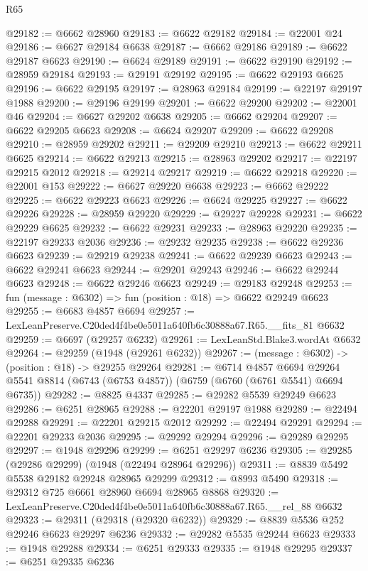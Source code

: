 \begin{lexlean}{R65}
\begin{coremodule}
{@29182 := @6662 @28960
@29183 := @6622 @29182
@29184 := @22001 @24
@29186 := @6627 @29184 @6638
@29187 := @6662 @29186
@29189 := @6622 @29187 @6623
@29190 := @6624 @29189
@29191 := @6622 @29190
@29192 := @28959 @29184
@29193 := @29191 @29192
@29195 := @6622 @29193 @6625
@29196 := @6622 @29195
@29197 := @28963 @29184
@29199 := @22197 @29197 @1988
@29200 := @29196 @29199
@29201 := @6622 @29200
@29202 := @22001 @46
@29204 := @6627 @29202 @6638
@29205 := @6662 @29204
@29207 := @6622 @29205 @6623
@29208 := @6624 @29207
@29209 := @6622 @29208
@29210 := @28959 @29202
@29211 := @29209 @29210
@29213 := @6622 @29211 @6625
@29214 := @6622 @29213
@29215 := @28963 @29202
@29217 := @22197 @29215 @2012
@29218 := @29214 @29217
@29219 := @6622 @29218
@29220 := @22001 @153
@29222 := @6627 @29220 @6638
@29223 := @6662 @29222
@29225 := @6622 @29223 @6623
@29226 := @6624 @29225
@29227 := @6622 @29226
@29228 := @28959 @29220
@29229 := @29227 @29228
@29231 := @6622 @29229 @6625
@29232 := @6622 @29231
@29233 := @28963 @29220
@29235 := @22197 @29233 @2036
@29236 := @29232 @29235
@29238 := @6622 @29236 @6623
@29239 := @29219 @29238
@29241 := @6622 @29239 @6623
@29243 := @6622 @29241 @6623
@29244 := @29201 @29243
@29246 := @6622 @29244 @6623
@29248 := @6622 @29246 @6623
@29249 := @29183 @29248
@29253 := fun (message : @6302) => fun (position : @18) => @6622 @29249 @6623
@29255 := @6683 @4857 @6694
@29257 := LexLeanPreserve.C20ded4f4be0e5011a640fb6c30888a67.R65.__fits_81 @6632
@29259 := @6697 (@29257 @6232)
@29261 := LexLeanStd.Blake3.wordAt @6632
@29264 := @29259 (@1948 (@29261 @6232))
@29267 := (message : @6302) -> (position : @18) -> @29255 @29264
@29281 := @6714
    @4857
    @6694
    @29264
    @5541
    @8814
    (@6743 (@6753 @4857))
    (@6759 (@6760 (@6761 @5541) @6694 @6735))
@29282 := @8825 @4337
@29285 := @29282 @5539 @29249 @6623
@29286 := @6251 @28965
@29288 := @22201 @29197 @1988
@29289 := @22494 @29288
@29291 := @22201 @29215 @2012
@29292 := @22494 @29291
@29294 := @22201 @29233 @2036
@29295 := @29292 @29294
@29296 := @29289 @29295
@29297 := @1948 @29296
@29299 := @6251 @29297 @6236
@29305 := @29285 (@29286 @29299) (@1948 (@22494 @28964 @29296))
@29311 := @8839 @5492 @5538 @29182 @29248 @28965 @29299
@29312 := @8993 @5490
@29318 := @29312 @725 @6661 @28960 @6694 @28965 @8868
@29320 := LexLeanPreserve.C20ded4f4be0e5011a640fb6c30888a67.R65.__rel_88 @6632
@29323 := @29311 (@29318 (@29320 @6232))
@29329 := @8839 @5536 @252 @29246 @6623 @29297 @6236
@29332 := @29282 @5535 @29244 @6623
@29333 := @1948 @29288
@29334 := @6251 @29333
@29335 := @1948 @29295
@29337 := @6251 @29335 @6236
}
\end{coremodule}
\end{lexlean}

